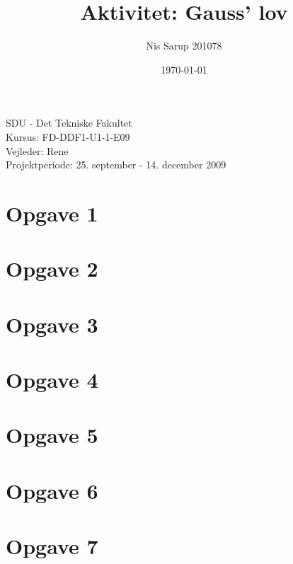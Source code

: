 \documentclass[a4paper,10pt]{article}
\begin{document}
\title{Aktivitet: Gauss’ lov}
\author{Nis Sarup 201078}
\date{\today}
\maketitle
\begin{center}
	SDU - Det Tekniske Fakultet\\
	Kursus: FD-DDF1-U1-1-E09\\
	Vejleder: Rene \\
	Projektperiode: 25. september - 14. december 2009\\
\end{center}
\newpage

\section{Opgave 1} %
\label{sec:opgave_1}

\newpage

\section{Opgave 2} %
\label{sec:opgave_2}


\section{Opgave 3} %
\label{sec:opgave_3}


\section{Opgave 4} %
\label{sec:opgave_4}

\newpage

\section{Opgave 5} %
\label{sec:opgave_5}


\section{Opgave 6} %
\label{sec:opgave_6}


\section{Opgave 7} %
\label{sec:opgave_7}

\newpage
\end{document}

